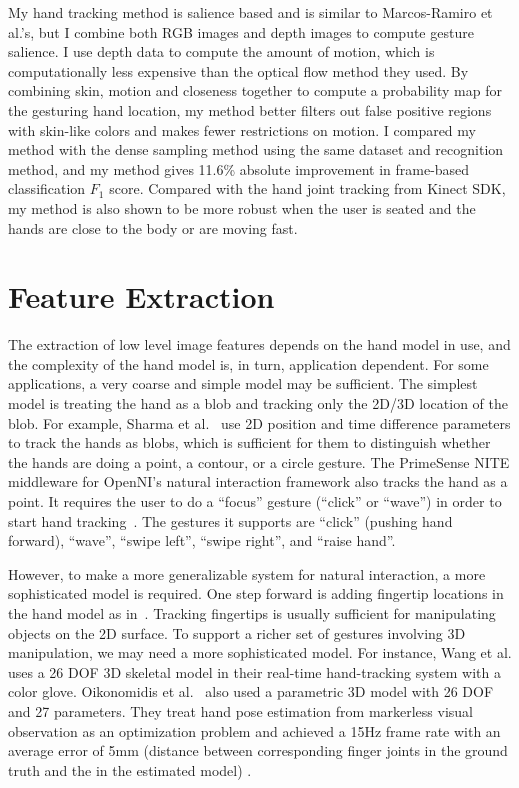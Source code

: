 My hand tracking method is salience based and is similar to Marcos-Ramiro
et al.'s, but I combine both RGB images and depth images to compute gesture salience. I use depth data to compute the
 amount of motion, which is computationally less expensive than the optical flow
 method they used. By combining skin, motion
and closeness together to compute a probability map for the gesturing hand
location, my method better filters out false positive regions with skin-like
colors and makes fewer restrictions on motion. I compared my method with the
dense sampling method using the same dataset and recognition method, and my
method gives 11.6\% absolute improvement in frame-based classification $F_1$
score. Compared with the hand joint tracking from Kinect SDK, my method is also
shown to be more robust when the user is seated and the hands are close to the body or are moving fast.

\section{Feature Extraction}
The extraction of low level image features depends on the hand model in use, and
the complexity of the hand model is, in turn,  application dependent.
For some applications, a very coarse and simple model may be sufficient. The
simplest model is treating the hand as a blob and tracking only the 2D/3D
location of the blob. For example, Sharma et al.~\cite{sharma00} use 2D position
and time difference parameters to track the hands as blobs, which is sufficient
for them to distinguish whether the hands are doing a point, a contour, or a circle gesture. The PrimeSense NITE
middleware for OpenNI's natural interaction framework also tracks the hand as a
point. It requires the user to do a ``focus'' gesture (``click'' or ``wave'')
in order to start hand tracking~\cite{primesense-manual}. The
gestures it supports are ``click'' (pushing hand forward), ``wave'', ``swipe
left'', ``swipe right'', and ``raise hand''.

However, to make a more generalizable system for natural interaction, a
more sophisticated model is required. One step forward is adding fingertip
locations in the hand model as in~\cite{Oka02, harrison11,
larson11}.
Tracking fingertips is usually sufficient for manipulating objects on the 2D surface. 
To support a richer set of gestures involving 3D manipulation, we may need a
more sophisticated model. For instance, Wang et al. \cite{Wang09} uses a 26 DOF
3D skeletal model in their real-time hand-tracking system with a color glove.
Oikonomidis et al.~\cite{oikonomidis11} also used a parametric 3D model with 26
DOF and 27 parameters. They treat hand pose estimation from markerless visual
observation as an optimization problem and achieved a 15Hz frame rate with
an average error of 5mm (distance between corresponding finger joints in the
ground truth and the in the estimated model) .

